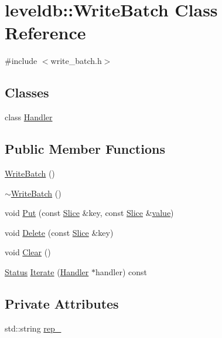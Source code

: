 \hypertarget{classleveldb_1_1_write_batch}{\section{leveldb\-:\-:Write\-Batch Class Reference}
\label{classleveldb_1_1_write_batch}
}


{\ttfamily \#include $<$write\-\_\-batch.\-h$>$}

\subsection*{Classes}
\begin{DoxyCompactItemize}
\item 
class \hyperlink{classleveldb_1_1_write_batch_1_1_handler}{Handler}
\end{DoxyCompactItemize}
\subsection*{Public Member Functions}
\begin{DoxyCompactItemize}
\item 
\hyperlink{classleveldb_1_1_write_batch_a5287eda973cfd100149a034c871dcc44}{Write\-Batch} ()
\item 
\hyperlink{classleveldb_1_1_write_batch_a5bc7decc31279f2457839b30ad8daca5}{$\sim$\-Write\-Batch} ()
\item 
void \hyperlink{classleveldb_1_1_write_batch_a30770379143a7ccb4ede18ddf0e45bf3}{Put} (const \hyperlink{classleveldb_1_1_slice}{Slice} \&key, const \hyperlink{classleveldb_1_1_slice}{Slice} \&\hyperlink{cache_8cc_a0f61d63b009d0880a89c843bd50d8d76}{value})
\item 
void \hyperlink{classleveldb_1_1_write_batch_a473da7f94483dab253cc36b7b231ce53}{Delete} (const \hyperlink{classleveldb_1_1_slice}{Slice} \&key)
\item 
void \hyperlink{classleveldb_1_1_write_batch_afd5058344dc9be113919a5110129006f}{Clear} ()
\item 
\hyperlink{classleveldb_1_1_status}{Status} \hyperlink{classleveldb_1_1_write_batch_ac6cb5a360bb095f4e9a6e817c4322a9d}{Iterate} (\hyperlink{classleveldb_1_1_write_batch_1_1_handler}{Handler} $\ast$handler) const 
\end{DoxyCompactItemize}
\subsection*{Private Attributes}
\begin{DoxyCompactItemize}
\item 
std\-::string \hyperlink{classleveldb_1_1_write_batch_acb95a84f553a7dfa89f27a0500060837}{rep\-\_\-}
\end{DoxyCompactItemize}
